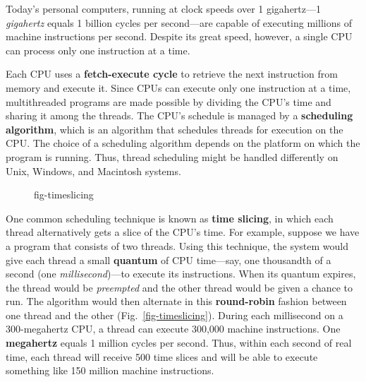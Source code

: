 Today's personal computers, running at clock speeds over 1
gigahertz---1 {\it gigahertz} equals 1 billion cycles per second---are capable of executing 
millions of machine instructions per second.
Despite its great speed, however, a single CPU can process only one
instruction at a time.

Each CPU uses a {\bf fetch-execute cycle}
to retrieve the next instruction from memory and execute it.  Since
CPUs can execute only one instruction at a time, multithreaded
programs are made possible by dividing the CPU's time and sharing it
among the threads.  The CPU's schedule is managed by a {\bf scheduling
algorithm}, which is an algorithm that schedules threads for execution
on the CPU. The choice of a scheduling algorithm depends on the
platform on which the program is running. Thus, thread scheduling might
be handled differently on Unix, Windows, and Macintosh systems.


\begin{figure}[tb]
 {fig-timeslicing}

\end{figure}

One common scheduling technique is known as {\bf time slicing},
in which each thread alternatively gets a slice of the CPU's time.
For example, suppose we have a program that consists of two threads.
Using this technique, the system would give each thread a small {\bf
quantum} of CPU time---say, one thousandth of a second (one {\it
millisecond})---to execute its instructions.  When its quantum
expires, the thread would be {\it preempted} and the other thread
would be given a chance to run.  The algorithm would then alternate in this
{\bf round-robin} fashion between one thread and the other
(Fig.~\ref{fig-timeslicing}). During each millisecond on a 300-megahertz CPU, 
a thread can execute 300,000 machine
instructions.  One {\bf megahertz} equals 1 million
cycles per second. Thus, within each second of real time, each thread will
receive 500 time slices and will be able to execute something like
150 million machine instructions.



